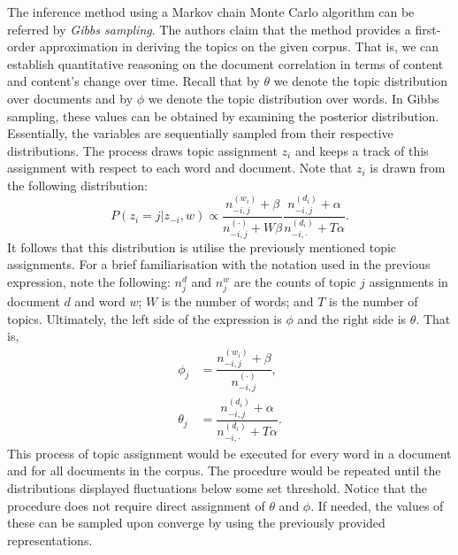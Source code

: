 \documentclass{mprop}
\begin{document}
\par The inference method using a Markov chain Monte Carlo algorithm can be referred by \textit{Gibbs sampling}. The authors claim that the method provides a first-order approximation in deriving the topics on the given corpus. That is, we can establish quantitative reasoning on the document correlation in terms of content and content's change over time. Recall that by $\theta$ we denote the topic distribution over documents and by $\phi$ we denote the topic distribution over words. In Gibbs sampling, these values can be obtained by examining the posterior distribution. Essentially, the variables are sequentially sampled from their respective distributions. The process draws topic assignment $z_i$ and keeps a track of this assignment with respect to each word and document. Note that $z_i$ is drawn from the following distribution:
\begin{equation}
P(z_i = j | z_{-i}, w) \propto \dfrac{n_{-i, j}^{(w_i)} + \beta}{n_{-i, j}^{(\cdot)} + W\beta}\dfrac{n_{-i, j}^{(d_i)} + \alpha}{n_{-i, \cdot}^{(d_i)} + T\alpha}.
\end{equation}
It follows that this distribution is utilise the previously mentioned topic assignments. For a brief familiarisation with the notation used in the previous expression, note the following: $n_j^{d}$ and $n_j^{w}$ are the counts of topic $j$ assignments in document $d$ and word $w$; $W$ is the number of words; and $T$ is the number of topics. Ultimately, the left side of the expression is $\phi$ and the right side is $\theta$. That is, 
\begin{align*}
\phi_j &= \dfrac{n_{-i, j}^{(w_i)} + \beta}{n_{-i, j}^{(\cdot)}},\\
\theta_j &= \dfrac{n_{-i, j}^{(d_i)} + \alpha}{n_{-i, \cdot}^{(d_i)} + T\alpha}.
\end{align*}
This process of topic assignment would be executed for every word in a document and for all documents in the corpus. The procedure would be repeated until the distributions displayed fluctuations below some set threshold. Notice that the procedure does not require direct assignment of $\theta$ and $\phi$. If needed, the values of these can be sampled upon converge by using the previously provided representations.
\end{document}
